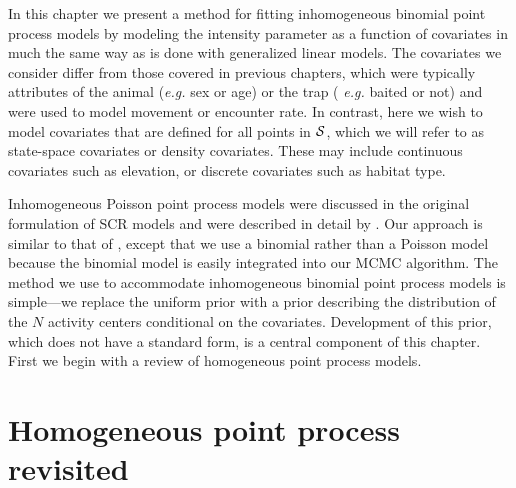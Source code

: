 In this chapter we present a method
for fitting inhomogeneous binomial point process models by modeling
the intensity parameter as a function of
covariates in much the same way as is done with generalized linear
models. The covariates we consider differ
from those covered in previous chapters, which were typically
attributes of the animal ({\it e.g.} sex or age) or the trap ({\it
  e.g.} baited or not) and were used to model movement or encounter
rate. In contrast, here we wish to
model covariates that are defined for all points in
$\cal{S}$, which we will refer to as
state-space covariates or density covariates. These may
include continuous covariates such as elevation, or discrete
covariates such as habitat type.

Inhomogeneous Poisson point process models were discussed in the original
formulation of SCR models \citep{efford:2004} and were described in
detail by \citet{borchers_efford:2008}. Our approach is
similar to that of \citet{borchers_efford:2008}, except that we use a binomial
rather than a Poisson model because the binomial model is
easily integrated into our MCMC algorithm.  %
The method we use to accommodate inhomogeneous binomial point process
models %
is simple---we
replace the uniform prior with a prior describing the
distribution of the $N$ activity centers conditional on the
covariates. Development of this prior, which does not have a
standard form, is a central component of this chapter. First we
begin with a review of homogeneous point process models.


\section{Homogeneous point process revisited}

